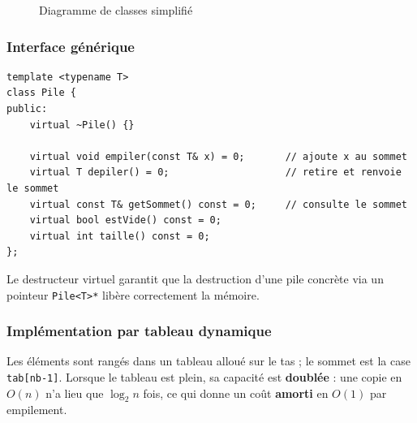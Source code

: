 \documentclass[11pt,a4paper]{article}
\newcommand{\code}[1]{\texttt{#1}}
\begin{document}
\begin{figure}[H]
\caption{Diagramme de classes simplifié}
\end{figure}

\subsubsection{Interface générique}

\begin{lstlisting}[caption={Interface \code{Pile<T>} (\code{Pile.h})}]
template <typename T>
class Pile {
public:
    virtual ~Pile() {}

    virtual void empiler(const T& x) = 0;       // ajoute x au sommet
    virtual T depiler() = 0;                    // retire et renvoie le sommet
    virtual const T& getSommet() const = 0;     // consulte le sommet
    virtual bool estVide() const = 0;
    virtual int taille() const = 0;
};
\end{lstlisting}

Le destructeur virtuel garantit que la destruction d'une pile concrète via
un pointeur \code{Pile<T>*} libère correctement la mémoire.

\subsubsection{Implémentation par tableau dynamique}

Les éléments sont rangés dans un tableau alloué sur le tas ; le sommet est
la case \code{tab[nb-1]}. Lorsque le tableau est plein, sa capacité est
\textbf{doublée} : une copie en $O(n)$ n'a lieu que $\log_2 n$ fois, ce qui
donne un coût \textbf{amorti} en $O(1)$ par empilement.
\end{document}
